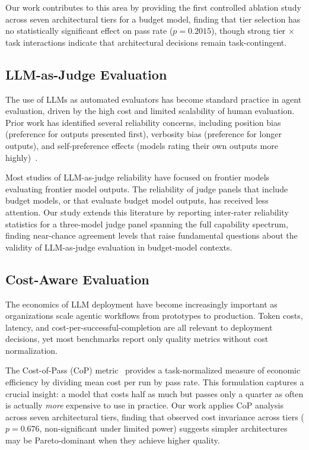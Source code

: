 \documentclass[11pt]{article}
\begin{document}
Our work contributes to this area by providing the first controlled ablation
study across seven architectural tiers for a budget model, finding that
tier selection has no statistically significant effect on pass rate
($p=0.2015$), though strong tier $\times$ task interactions indicate that
architectural decisions remain task-contingent.

\subsection{LLM-as-Judge Evaluation}
\label{sec:llm_judge}

The use of LLMs as automated evaluators has become standard practice in agent
evaluation, driven by the high cost and limited scalability of human
evaluation. Prior work has identified several reliability concerns, including
position bias (preference for outputs presented first), verbosity bias
(preference for longer outputs), and self-preference effects (models rating
their own outputs more highly)~\cite{polo2024efficient}.

Most studies of LLM-as-judge reliability have focused on frontier models
evaluating frontier model outputs. The reliability of judge panels that include
budget models, or that evaluate budget model outputs, has received less
attention. Our study extends this literature by reporting inter-rater
reliability statistics for a three-model judge panel spanning the full
capability spectrum, finding near-chance agreement levels that raise
fundamental questions about the validity of LLM-as-judge evaluation in
budget-model contexts.

\subsection{Cost-Aware Evaluation}
\label{sec:cost_aware}

The economics of LLM deployment have become increasingly important as
organizations scale agentic workflows from prototypes to production. Token
costs, latency, and cost-per-successful-completion are all relevant to
deployment decisions, yet most benchmarks report only quality metrics without
cost normalization.

The Cost-of-Pass (CoP) metric~\cite{scylla2026dryrun} provides a
task-normalized measure of economic efficiency by dividing mean cost per run
by pass rate. This formulation captures a crucial insight: a model that costs
half as much but passes only a quarter as often is actually \emph{more}
expensive to use in practice. Our work applies CoP analysis across seven
architectural tiers, finding that observed cost invariance across tiers
($p=0.676$, non-significant under limited power) suggests simpler
architectures may be Pareto-dominant when they achieve higher quality.
\end{document}
